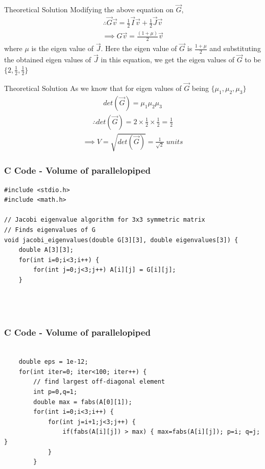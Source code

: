 \documentclass{beamer}
\begin{document}
\begin{frame}{Theoretical Solution}
Modifying the above equation on $\vec{G}$,
\begin{align*}
    \therefore \vec{G}\vec{v}=\frac{1}{2}\vec{I}\vec{v}+\frac{1}{2}\vec{J}\vec{v}
\end{align*}
\begin{align*}
    \implies G\vec{v}=\frac{(1+\mu)}{2}\vec{v}
\end{align*}
where $\mu$ is the eigen value of $\vec{J}$. Here the eigen value of $\vec{G}$ is $\frac{1+\mu}{2}$ and substituting the obtained eigen values of $\vec{J}$ in this equation, we get the eigen values of $\vec{G}$ to be $\{2,\frac{1}{2},\frac{1}{2}\}$
\end{frame}

\begin{frame}{Theoretical Solution}
As we know that for eigen values of $\vec{G}$ being $\{\mu_1,\mu_2,\mu_3\}$
\begin{align*}
    det(\vec{G})=\mu_1\mu_2\mu_3
\end{align*}
\begin{align*}
    \therefore det(\vec{G})=2\times\frac{1}{2}\times\frac{1}{2}=\frac{1}{2}
\end{align*}
\begin{align*}
    \implies V=\sqrt{det(\vec{G})}=\frac{1}{\sqrt{2}} \; units
\end{align*}
\end{frame}

\begin{frame}[fragile]
    \frametitle{C Code - Volume of parallelopiped}

    \begin{lstlisting}
#include <stdio.h>
#include <math.h>

// Jacobi eigenvalue algorithm for 3x3 symmetric matrix
// Finds eigenvalues of G
void jacobi_eigenvalues(double G[3][3], double eigenvalues[3]) {
    double A[3][3];
    for(int i=0;i<3;i++) {
        for(int j=0;j<3;j++) A[i][j] = G[i][j];
    }


        
    \end{lstlisting}
\end{frame}

\begin{frame}[fragile]
    \frametitle{C Code - Volume of parallelopiped}

    \begin{lstlisting}

    double eps = 1e-12;
    for(int iter=0; iter<100; iter++) {
        // find largest off-diagonal element
        int p=0,q=1;
        double max = fabs(A[0][1]);
        for(int i=0;i<3;i++) {
            for(int j=i+1;j<3;j++) {
                if(fabs(A[i][j]) > max) { max=fabs(A[i][j]); p=i; q=j; }
            }
        }
        
    \end{lstlisting}
\end{frame}
\end{document}
